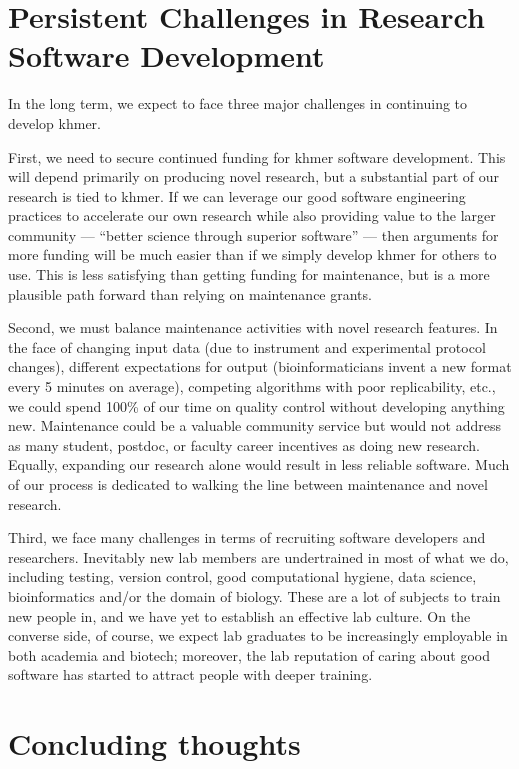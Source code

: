 \documentclass[12pt]{article}
\begin{document}
\section{Persistent Challenges in Research Software Development}

In the long term, we expect to face three major challenges in continuing
to develop khmer.

First, we need to secure continued funding for khmer software
development.  This will depend primarily on producing novel research,
but a substantial part of our research is tied to khmer.  If we can
leverage our good software engineering practices to accelerate our own
research while also providing value to the larger community ---
``better science through superior software'' --- then arguments for more
funding will be much easier than if we simply develop khmer for
others to use.  This is less satisfying than getting funding for maintenance,
but is a more plausible path forward than relying on maintenance grants.

Second, we must balance maintenance activities with novel research
features.  In the face of changing input data (due to instrument and
experimental protocol changes), different expectations for output
(bioinformaticians invent a new format every 5 minutes on average),
competing algorithms with poor replicability, etc., we could spend
100\% of our time on quality control without developing anything new.
Maintenance could be a valuable community service but would not address
as many student, postdoc, or faculty career incentives as doing new
research.  Equally, expanding our research alone would result in less
reliable software.  Much of our process is dedicated to walking the
line between maintenance and novel research.

Third, we face many challenges in terms of recruiting software
developers and researchers.  Inevitably new lab members are
undertrained in most of what we do, including testing, version
control, good computational hygiene, data science, bioinformatics
and/or the domain of biology.  These are a lot of subjects to train
new people in, and we have yet to establish an effective lab culture.
On the converse side, of course, we expect lab graduates to be
increasingly employable in both academia and biotech; moreover, the
lab reputation of caring about good software has started to attract
people with deeper training.

\section{Concluding thoughts}
\end{document}
